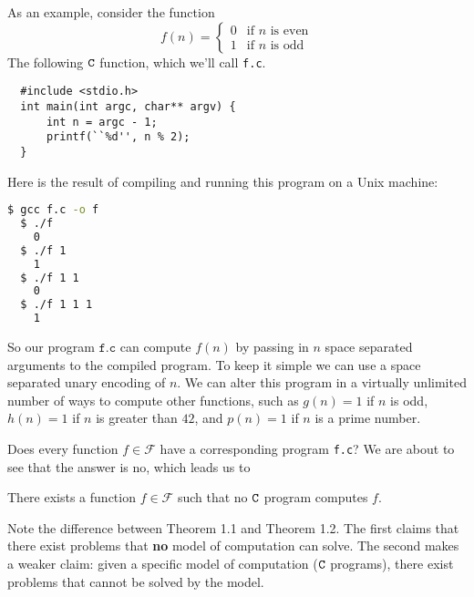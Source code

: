 \documentclass[english, 12pt]{article}
\begin{document}
  As an example, consider the function 
  \[f(n) = \begin{cases} 0 & \text{if $n$ is even} \\
                         1 & \text{if $n$ is odd} \end{cases}\]
  The following ${\texttt{C}}$ function, which we'll call \texttt{f.c}.
  \begin{lstlisting}
  #include <stdio.h>
  int main(int argc, char** argv) {
      int n = argc - 1;
      printf(``%d'', n % 2);
  }
  \end{lstlisting}
  Here is the result of compiling and running this program on a Unix machine:
  \begin{lstlisting}[language=bash]
  $ gcc f.c -o f
  $ ./f
    0
  $ ./f 1
    1
  $ ./f 1 1
    0
  $ ./f 1 1 1
    1
  \end{lstlisting}
  So our program $\texttt{f.c}$ can compute $f(n)$ by passing in 
  $n$ space separated arguments to the compiled program. To keep it simple we
  can use a space separated unary encoding of $n$. We can alter this program
  in a virtually unlimited number of ways to compute other functions, such
  as $g(n) = 1$ if $n$ is odd, $h(n) = 1$ if $n$ is greater than $42$, and 
  $p(n) = 1$ if $n$ is a prime number.\n

  Does every function $f \in \mathcal{F}$ have a corresponding program 
  \texttt{f.c}? We are about to see that the answer is no, which leads us
  to
  \begin{thrm} There exists a function $f \in \mathcal{F}$ such that no
               ${\texttt{C}}$ program computes $f$.
  \end{thrm}
  Note the difference between Theorem 1.1 and Theorem 1.2. The first claims
  that there exist problems that {\bf no} model of computation can solve. The
  second makes a weaker claim: given a specific model of computation (${\texttt{C}}$ 
  programs), there exist problems that cannot be solved by the model.
\end{document}
